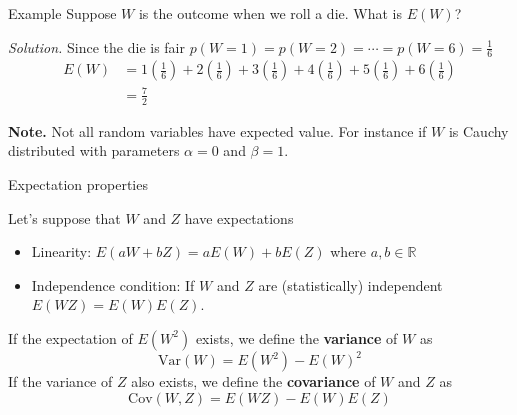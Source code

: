 \documentclass{beamer}
\begin{document}
\begin{frame}{Example}
	Suppose $W$ is the outcome when we roll a die. What is $E(W)$?
	
{\it Solution.} Since the die is fair $p(W=1)= p(W=2)= \cdots=p(W=6)=\frac 16$	
\begin{equation*}
\begin{split}
	E(W)&= 1 \left (\frac 16 \right) + 2 \left( \frac 16\right)+ 3 \left( \frac 16 \right) + 4 \left(\frac 16\right)+ 5 \left( \frac 16 \right) + 6 \left( \frac 16 \right)\\
	&= \frac 72
\end{split}
\end{equation*}

{\bf Note.} Not all random variables have expected value. For instance if $W$ is Cauchy distributed with parameters $\alpha =0$ and $\beta =1$. 
\end{frame}

\begin{frame}{Expectation properties}

Let's suppose that $W$ and $Z$ have expectations	
	\begin{itemize}
		\item Linearity: $E(aW+bZ)=a E(W)+b E(Z)$ where $a,b \in \mathbb{R}$
		\item Independence condition: If $W$ and $Z$ are (statistically) independent $E(WZ)= E(W)E(Z)$.
	\end{itemize}
If the expectation of $E(W^2)$ exists, we define the {\bf variance} of $W$ as
\begin{equation*}
\textrm{Var}(W)= E(W^2)-E(W)^2
\end{equation*}
If the variance of $Z$ also exists, we define the {\bf covariance} of $W$ and $Z$ as
\begin{equation*}
	\textrm{Cov}(W,Z)= E(WZ) - E(W)E(Z)
\end{equation*}

\end{frame}
\end{document}
